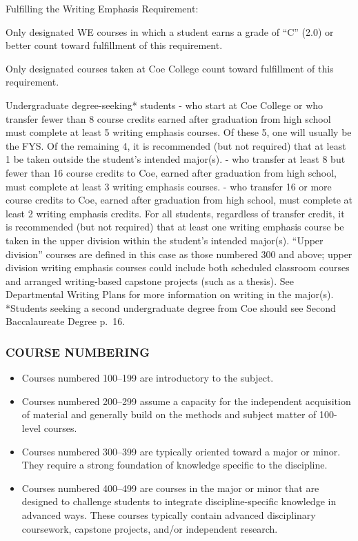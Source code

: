 \documentclass[
  letterpaper,
]{scrbook}
\providecommand{\tightlist}{%
  \setlength{\itemsep}{0pt}\setlength{\parskip}{0pt}}
\begin{document}
Fulfilling the Writing Emphasis Requirement:

Only designated WE courses in which a student earns a grade of ``C''
(2.0) or better count toward fulfillment of this requirement.

Only designated courses taken at Coe College count toward fulfillment of
this requirement.

Undergraduate degree-seeking* students - who start at Coe College or who
transfer fewer than 8 course credits earned after graduation from high
school must complete at least 5 writing emphasis courses. Of these 5,
one will usually be the FYS. Of the remaining 4, it is recommended (but
not required) that at least 1 be taken outside the student's intended
major(s). - who transfer at least 8 but fewer than 16 course credits to
Coe, earned after graduation from high school, must complete at least 3
writing emphasis courses. - who transfer 16 or more course credits to
Coe, earned after graduation from high school, must complete at least 2
writing emphasis credits. For all students, regardless of transfer
credit, it is recommended (but not required) that at least one writing
emphasis course be taken in the upper division within the student's
intended major(s). ``Upper division'' courses are defined in this case
as those numbered 300 and above; upper division writing emphasis courses
could include both scheduled classroom courses and arranged
writing-based capstone projects (such as a thesis). See Departmental
Writing Plans for more information on writing in the major(s). *Students
seeking a second undergraduate degree from Coe should see Second
Baccalaureate Degree p.~16.

\hypertarget{course-numbering}{%
\subsubsection{COURSE NUMBERING}\label{course-numbering}}

\begin{itemize}
\tightlist
\item
  Courses numbered 100--199 are introductory to the subject.
\item
  Courses numbered 200--299 assume a capacity for the independent
  acquisition of material and generally build on the methods and subject
  matter of 100-level courses.
\item
  Courses numbered 300--399 are typically oriented toward a major or
  minor. They require a strong foundation of knowledge specific to the
  discipline.
\item
  Courses numbered 400--499 are courses in the major or minor that are
  designed to challenge students to integrate discipline-specific
  knowledge in advanced ways. These courses typically contain advanced
  disciplinary coursework, capstone projects, and/or independent
  research.
\end{itemize}
\end{document}
